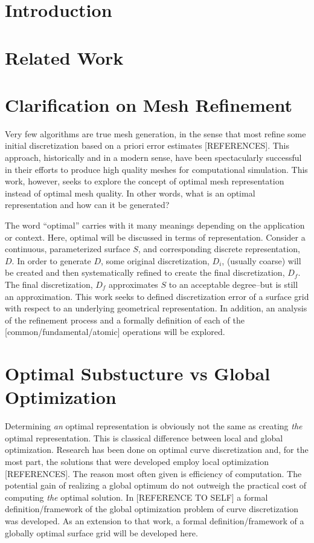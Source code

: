 \documentclass[11pt]{article}
\begin{document}
\section{Introduction}
\section{Related Work}
\section{Clarification on Mesh Refinement}
Very few algorithms are true mesh generation, in the sense that most refine some initial discretization based on a priori error estimates [REFERENCES]. This approach, historically and in a modern sense, have been spectacularly successful in their efforts to produce high quality meshes for computational simulation. This work, however, seeks to explore the concept of optimal mesh representation instead of optimal mesh quality. In other words, what is an optimal representation and how can it be generated?

The word ``optimal'' carries with it many meanings depending on the application or context. Here, optimal will be discussed in terms of representation. Consider a continuous, parameterized surface $S$, and corresponding discrete representation, $D$. In order to generate $D$, some original discretization, $D_i$, (usually coarse) will be created and then systematically refined to create the final discretization, $D_f$. The final discretization, $D_f$ approximates $S$ to an acceptable degree--but is still an approximation. This work seeks to defined discretization error of a surface grid with respect to an underlying geometrical representation. In addition, an analysis of the refinement process and a formally definition of each of the [common/fundamental/atomic] operations will be explored.

\section{Optimal Substucture vs Global Optimization}
Determining {\it an} optimal representation is obviously not the same as creating {\it the} optimal representation. This is classical difference between local and global optimization. Research has been done on optimal curve discretization and, for the most part, the solutions that were developed employ local optimization [REFERENCES]. The reason most often given is efficiency of computation. The potential gain of realizing a global optimum do not outweigh the practical cost of computing {\it the} optimal solution. In [REFERENCE TO SELF] a formal definition/framework of the global optimization problem of curve discretization was developed. As an extension to that work, a formal definition/framework of a globally optimal surface grid will be developed here.
\end{document}
